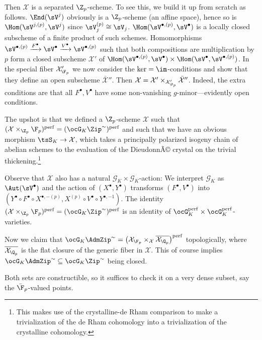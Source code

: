 \documentclass[a4paper]{scrartcl} %
\numberwithin{equation}{section}
\begin{document}
\begin{Proof}
  Then $\mathcal{X}$ is a separated $\Z_p$-scheme. To see this, we build it up from scratch as follows.
  $\End(\sV^j)$ obviously is a $\Z_p$-scheme (an affine space), hence so is $\Hom(\sV^{j,(p)},\sV^j)$ since
  $\sV_j^{(p)}\cong \sV_j$.
  $\Hom(\sV^{\bullet,(p)},\sV^\bullet)$ is a locally closed subscheme of a finite product of such schemes.
  Homomorphisms $\sV^{\bullet,(p)} \xrightarrow{F^\bullet} \sV^\bullet \xrightarrow{V^\bullet} \sV^{\bullet,(p)}$ such that both compositions are multiplication by $p$ form a closed subscheme $\mathcal{X}'$ of $\Hom(\sV^{\bullet,(p)},\sV^\bullet) \times \Hom(\sV^\bullet,\sV^{\bullet,(p)})$.
  In the special fiber $\mathcal{X}'_{\F_p}$ we now consider the $\ker=\im$-conditions and show that they define an open subscheme $\bar{\mathcal{X}}''$. Then $\mathcal{X}=\mathcal{X}'\times_{\mathcal{X}'_{\F_p}}\bar{\mathcal{X}}''$.
  Indeed, the extra conditions are that all $F^\bullet,V^\bullet$ have some non-vanishing $g$-minor---evidently open conditions. 

  The upshot is that we defined a  $\Z_p$-scheme $\mathcal{X}$ such that $(\mathcal{X}\times_{\Z_p}\F_p)^\mathrm{perf}=(\ocG_K\Zip^{\sim})^\mathrm{perf}$ and such that we have an obvious morphism $\tsS_K\to \mathcal{X}$, which takes a principally polarized isogeny chain of abelian schemes to the evaluation of the DieudonnÃ© crystal on the trivial thickening.\footnote{This makes use of the crystalline-de Rham comparison to make a trivialization of the de Rham cohomology into a trivialization of the crystalline cohomology.}

  Observe that $\mathcal{X}$ also has a natural $\mathcal{G}_K\times\mathcal{G}_K$-action: We interpret $\mathcal{G}_K$ as $\Aut(\sV^\bullet)$ and the action of $(X^\bullet,Y^\bullet)$ transforms $(F^\bullet,V^\bullet)$ into $(Y^\bullet\circ F^\bullet \circ X^{\bullet,-(p)},  X^{(p)}\circ V^\bullet\circ Y^{\bullet,-1})$. The identity $(\mathcal{X}\times_{\Z_p}\F_p)^\mathrm{perf}=(\ocG_K\Zip^{\sim})^\mathrm{perf}$ is an identity of $\ocG_K^\mathrm{perf}\times\ocG_K^\mathrm{perf}$-varieties.

  Now we claim that $\ocG_K\AdmZip^{\sim} = \left(\mathcal{X}_{\F_p}\times_{\mathcal{X}}\overline{\mathcal{X}_{\Q_p}}\right)^\mathrm{perf}$ topologically, where $\overline{\mathcal{X}_{\Q_p}}$ is the flat closure of the generic fiber in $\mathcal{X}$. This of course implies
  $\ocG_K\AdmZip^{\sim}\subseteq \ocG_K\Zip^{\sim}$ being closed.

  
  Both sets are constructible, so it suffices to check it on a very dense subset, say the $\bar\F_p$-valued points.


\end{Proof}
\end{document}
